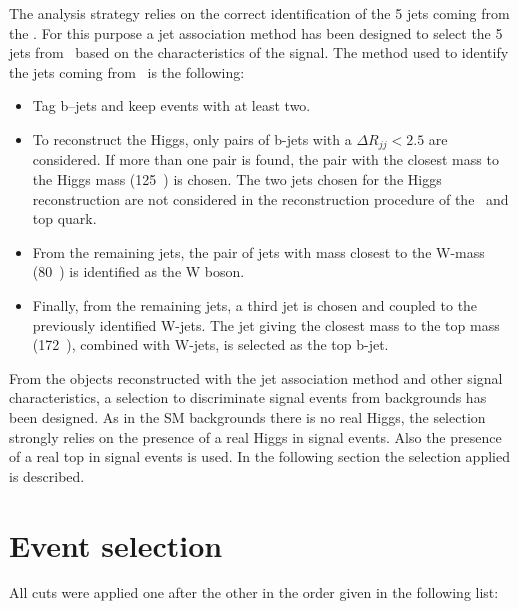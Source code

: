 The analysis strategy relies on the correct identification of the 5 jets coming from the \Tp. For this purpose a jet association method has been designed to select the 5 jets from \Tp~based on the characteristics of the signal. The method used to identify the jets coming from \Tp~is the following:
\begin{itemize}
\item Tag b--jets and keep events with at least two.
\item To reconstruct the Higgs, only pairs of b-jets with a $\Delta R_{jj} <2.5$ are considered. If more than one pair is found, the pair with the closest mass to the Higgs mass (125~\GeVcc) is chosen. The two jets chosen for the Higgs reconstruction are not considered in the reconstruction procedure of the \W~and top quark.
\item From the remaining jets, the pair of jets with mass closest to the W-mass (80~\GeVcc) is identified as the W boson. 
\item Finally, from the remaining jets, a third jet is chosen and coupled to the previously identified W-jets. The jet giving the closest mass to the top mass (172~\GeVcc), combined with W-jets, is selected as the top b-jet.
\end{itemize}

From the objects reconstructed with the jet association method and other signal characteristics, a selection to discriminate signal events from backgrounds has been designed. As in the SM backgrounds there is no real Higgs, the selection strongly relies on the presence of a real Higgs in signal events. Also the presence of a real top in signal events is used. In the following section the selection applied is described.

\section{Event selection}
\label{sec:Psel}

All cuts were applied one after the other in the order given in the following list:


